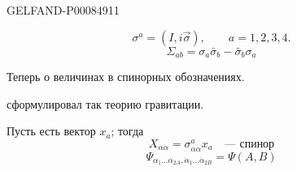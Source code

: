 \begin{GelfandAdjacentEvidence}{GELFAND-P000849}{11}

\[
\sigma^a=(I,i\vec\sigma),\qquad a=1,2,3,4.
\]
\[
\Sigma_{ab}=\sigma_a\bar\sigma_b-\bar\sigma_b\sigma_a \tag{4}
\]

Теперь о величинах в спинорных обозначениях.

 сформулировал так теорию гравитации.

Пусть есть вектор \(x_a\); тогда
\[
X_{\alpha\dot\alpha}=\sigma^a_{\alpha\dot\alpha}x_a\quad\text{— спинор} \tag{5}
\]
\[
\Psi_{\alpha_1\ldots\alpha_{2A},\dot\alpha_1\ldots\dot\alpha_{2B}}=\Psi(A,B) \tag{6}
\]
\end{GelfandAdjacentEvidence}



